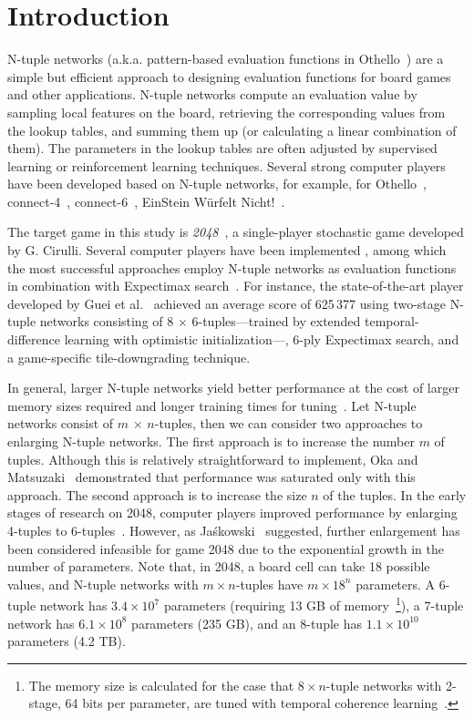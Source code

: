 \section{Introduction}

N-tuple networks (a.k.a. pattern-based evaluation functions in Othello~\cite{Buro98}) are a simple but
efficient approach to designing evaluation functions for board games and other applications.
N-tuple networks compute an evaluation value by sampling local features on the board, retrieving the corresponding values from the lookup tables, and summing them up (or calculating a linear combination of them).
The parameters in the lookup tables are often adjusted by supervised learning or reinforcement learning techniques.
Several strong computer players have been developed based on N-tuple networks, for example,  for Othello~\cite{Buro98,Jask14,NgIL12,KuSM25}, \mbox{connect-4}~\cite{ThKK12}, connect-6~\cite{HuQP18}, EinStein W\"urfelt Nicht!~\cite{CHHH24,HsHs25}.

The target game in this study is \emph{2048}~\cite{2048}, a single-player stochastic game developed by G. Cirulli.
Several computer players have been implemented \cite{Mats21,ASOH22,GuCW22,SzJa14,YWHC16,Jask18,KGWW22,Zhou19,WaMa25}, among which the most successful approaches employ N-tuple networks as evaluation functions~\cite{SzJa14} in combination with Expectimax search~\cite{YWHC16}.
For instance, the state-of-the-art player developed by Guei et al.~\cite{GuCW22} achieved an average score of 625\,377 using two-stage N-tuple networks consisting of 8 $\times$ 6-tuples---trained by extended temporal-difference learning with optimistic initialization---, 6-ply Expectimax search, and a game-specific tile-downgrading technique.


In general, larger N-tuple networks yield better performance at the cost of larger memory sizes required and longer training times for tuning~\cite{TeMa25}.
Let N-tuple networks consist of $m$ $\times$ $n$-tuples, then we can consider two approaches to enlarging N-tuple networks.
The first approach is to increase the number $m$ of tuples.  Although this is relatively straightforward to implement, Oka and Matsuzaki~\cite{OkMa16} demonstrated that performance was saturated only with this approach.
The second approach is to increase the size $n$ of the tuples.  In the early stages of research on 2048, computer players improved performance by enlarging 4-tuples to 6-tuples~\cite{SzJa14,YWHC16}.  However, as Ja\'skowski~\cite{Jask18} suggested, further enlargement has been considered infeasible for game 2048 due to the exponential growth in the number of parameters.  Note that, in 2048, a board cell can take 18 possible values, and N-tuple networks with $m$\,$\times$\,$n$-tuples have $m\times 18^n$ parameters.  A 6-tuple network has $3.4\times 10^7$ parameters (requiring 13 GB of memory~\footnote{The memory size is calculated for the case that 8\,$\times$\,$n$-tuple networks with 2-stage, 64 bits per parameter, are tuned with temporal coherence learning~\cite{Jask18}.}), a 7-tuple network has $6.1\times 10^8$ parameters (235 GB), and an 8-tuple has $1.1\times 10^{10}$ parameters (4.2 TB).



